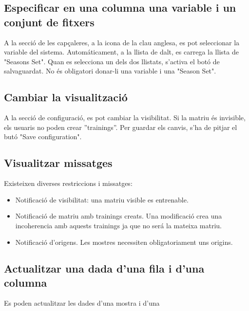\subsection{Especificar en una columna una variable i un conjunt de fitxers}
A la secci\'{o} de les capçaleres, a la icona de la clau anglesa, es pot seleccionar la variable del sistema. Autom\'{a}ticament, a la llista de dalt, es carrega la llista de "Seasons Set". Quan es selecciona un dels dos llistats, s'activa el bot\'{o} de salvaguardat. No \'{e}s obligatori donar-li una variable i una "Season Set".

\subsection{Cambiar la visualitzaci\'{o}}
A la secci\'{o} de configuraci\'{o}, es pot cambiar la visibilitat. Si la matriu \'{e}s invisible, els usuaris no poden crear ''trainings''. Per guardar els canvis, s'ha de pitjar el but\'{o} "Save configuration".

\subsection{Visualitzar missatges}
Existeixen diverses restriccions i missatges:
\begin{itemize}
\item Notificaci\'{o} de visibilitat: una matriu visible es entrenable. 
\item Notificaci\'{o} de matriu amb trainings creats. Una modificaci\'{o} crea una incoherencia amb aquests trainings ja que no ser\'{a} la mateixa matriu.
\item Notificaci\'{o} d'origens. Les mostres necessiten obligatoriament uns origins.
\end{itemize}

\subsection{Actualitzar una dada d'una fila i d'una columna}
Es poden actualitzar les dades d'una mostra i d'una 

